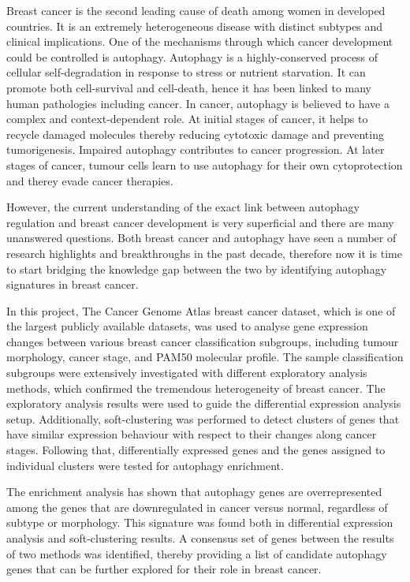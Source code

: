 Breast cancer is the second leading cause of death among women in developed countries. It is an extremely heterogeneous disease with distinct subtypes and clinical implications. One of the mechanisms through which cancer development could be controlled is autophagy. Autophagy is a highly-conserved process of cellular self-degradation in response to stress or nutrient starvation. It can promote both cell-survival and cell-death, hence it has been linked to many human pathologies including cancer. In cancer, autophagy is believed to have a complex and context-dependent role. At initial stages of cancer, it helps to recycle damaged molecules thereby reducing cytotoxic damage and preventing tumorigenesis. Impaired autophagy contributes to cancer progression. At later stages of cancer, tumour cells learn to use autophagy for their own cytoprotection and therey evade cancer therapies. 

However, the current understanding of the exact link between autophagy regulation and breast cancer development is very superficial and there are many unanswered questions. Both breast cancer and autophagy have seen a number of research highlights and breakthroughs in the past decade, therefore now it is time to start bridging the knowledge gap between the two by identifying autophagy signatures in breast cancer. 

In this project, The Cancer Genome Atlas breast cancer dataset, which is one of the largest publicly available datasets, was used to analyse gene expression changes between various breast cancer classification subgroups, including tumour morphology, cancer stage, and PAM50 molecular profile. The sample classification subgroups were extensively investigated with different exploratory analysis methods, which confirmed the tremendous heterogeneity of breast cancer. The exploratory analysis results were used to guide the differential expression analysis setup. Additionally, soft-clustering was performed to detect clusters of genes that have similar expression behaviour with respect to their changes along cancer stages. Following that, differentially expressed genes and the genes assigned to individual clusters were tested for autophagy enrichment. 

The enrichment analysis has shown that autophagy genes are overrepresented among the genes that are downregulated in cancer versus normal, regardless of subtype or morphology. This signature was found both in differential expression analysis and soft-clustering results. A consensus set of genes between the results of two methods was identified, thereby providing a list of candidate autophagy genes that can be further explored for their role in breast cancer. 
